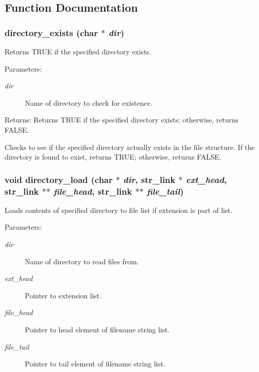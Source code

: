 \subsection{Function Documentation}
\subsubsection{ directory\_\-exists (char $\ast$ {\em dir})}\label{util_8h_a5}


Returns TRUE if the specified directory exists. 

\begin{Desc}
\item[Parameters:]
\begin{description}
\item[{\em dir}]Name of directory to check for existence. \end{description}
\end{Desc}
\begin{Desc}
\item[Returns:]Returns TRUE if the specified directory exists; otherwise, returns FALSE.\end{Desc}
Checks to see if the specified directory actually exists in the file structure. If the directory is found to exist, returns TRUE; otherwise, returns FALSE. 
\subsubsection{\setlength{\rightskip}{0pt plus 5cm}void directory\_\-load (char $\ast$ {\em dir}, {\bf str\_\-link} $\ast$ {\em ext\_\-head}, {\bf str\_\-link} $\ast$$\ast$ {\em file\_\-head}, {\bf str\_\-link} $\ast$$\ast$ {\em file\_\-tail})}\label{util_8h_a6}


Loads contents of specified directory to file list if extension is part of list. 

\begin{Desc}
\item[Parameters:]
\begin{description}
\item[{\em dir}]Name of directory to read files from. \item[{\em ext\_\-head}]Pointer to extension list. \item[{\em file\_\-head}]Pointer to head element of filename string list. \item[{\em file\_\-tail}]Pointer to tail element of filename string list.\end{description}
\end{Desc}


